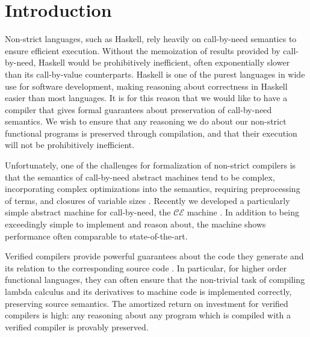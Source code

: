 \section{Introduction} \label{sec:introduction}
Non-strict languages, such as Haskell, rely heavily on call-by-need semantics to
ensure efficient execution. Without the memoization of results provided by
call-by-need, Haskell would be prohibitively inefficient, often exponentially
slower than its call-by-value counterparts. Haskell is one of the purest
languages in wide use for software development, making reasoning about
correctness in Haskell easier than most languages. It is for this reason that
we would like to have a compiler that gives formal guarantees about preservation
of call-by-need semantics. We wish to ensure that any reasoning we do about
our non-strict functional programs is preserved through compilation, and that
their execution will not be prohibitively inefficient.

Unfortunately, one of the challenges for formalization of non-strict compilers
is that the semantics of call-by-need abstract machines tend to be complex,
incorporating complex optimizations into the semantics, requiring preprocessing
of terms, and closures of variable sizes \cite{jonesstg, TIM}. Recently we
developed a particularly simple abstract machine for call-by-need, the
$\mathcal{CE}$ machine \cite{cem}. In addition to being exceedingly simple to
implement and reason about, the machine shows performance often comparable to
state-of-the-art.

Verified compilers provide powerful guarantees about the code they generate and
its relation to the corresponding source code \cite{chlipala2007certified,
leroy2012compcert, cakeml14}.  In particular, for higher order functional
languages, they can often ensure that the non-trivial task of compiling lambda
calculus and its derivatives to machine code is implemented correctly,
preserving source semantics. The amortized return on investment for verified
compilers is high: any reasoning about any program which is compiled with a
verified compiler is provably preserved. 

